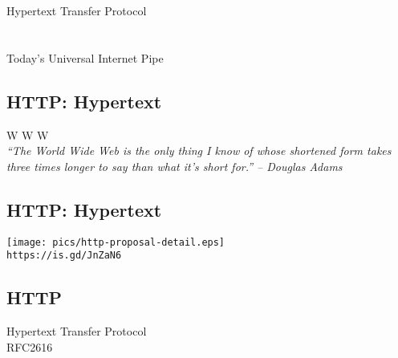 \documentclass[xga]{xdvislides}
\begin{document}
\newpage
\vspace*{\fill}
\begin{center}
	\Hugesize
		Hypertext Transfer Protocol\\ [1em]
	\hspace*{5mm}
	\blueline\\
	\hspace*{5mm}\\
		Today's Universal Internet Pipe
\end{center}
\vspace*{\fill}

%
%
%

\subsection{HTTP: Hypertext}
\vspace{.5in}
\begin{center}
	\Huge
	W W W
	\\
\vspace{.5in}
	{\em ``The World Wide Web is the only thing I know of whose shortened form
	takes three times longer to say than what it's short for.'' -- Douglas Adams}
\end{center}
\Normalsize


\subsection{HTTP: Hypertext}
\begin{center}
	\texttt{[image: pics/http-proposal-detail.eps]} \\
	\vspace{.5in}
	\verb+https://is.gd/JnZaN6+
\end{center}

\subsection{HTTP}
\vspace{.5in}
\begin{center}
	\Huge
	Hypertext Transfer Protocol
	\\
	\vspace{.5in}
	RFC2616
\end{center}
\Normalsize
\end{document}
